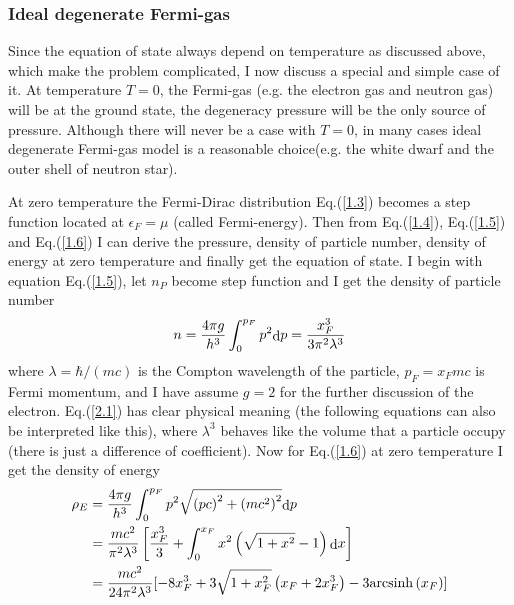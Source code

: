 \documentclass[reprint]{revtex4-1}
\begin{document}
\subsubsection{Ideal degenerate Fermi-gas}
Since the equation of state always depend on temperature as discussed above, which make the problem complicated, I now discuss a special and simple case of it. At temperature $T=0$,  the Fermi-gas (e.g. the electron gas and neutron gas) will be at the ground state, the degeneracy pressure will be the only source of pressure. Although there will never be a case with $T=0$, in many cases ideal degenerate Fermi-gas model is a reasonable choice(e.g. the white dwarf and the outer shell of neutron star). \par
At zero temperature the Fermi-Dirac distribution Eq.(\ref{1.3}) becomes a step function located at $\epsilon_F=\mu$ (called Fermi-energy). Then from Eq.(\ref{1.4}), Eq.(\ref{1.5}) and Eq.(\ref{1.6}) I can derive the pressure, density of particle number, density of energy at zero temperature and finally get the equation of state. I begin with equation Eq.(\ref{1.5}), let $n_P$  become step function and I get the density of particle number 
\begin{equation}
n = \frac{{4\pi g}}{{{h^3}}}\int_0^{{p_F}} {{p^2}{\mathop{\rm d}\nolimits} p}  = \frac{{x_F^3}}{{3{\pi ^2}{\lambda ^3}}} \label{2.1}
\end{equation}
where $\lambda  = \hbar /\left( {mc} \right)$ is the Compton wavelength of the particle, ${p_F} = {x_F}mc$ is Fermi momentum, and I have assume $g=2$ for the further discussion of the electron. Eq.(\ref{2.1}) has clear physical meaning (the following equations can also be interpreted like this), where $\lambda^3$ behaves like the volume that a particle occupy (there is just a difference of coefficient). Now for Eq.(\ref{1.6}) at zero temperature I get the density of energy
\begin{align}
	 {\rho _E} &= {{4\pi g} \over {{h^3}}}\int_0^{{p_F}} {{p^2}\sqrt {{{\left( {pc} \right)}^2} + {{\left( {m{c^2}} \right)}^2}} {\mathop{\rm d}\nolimits} p}  \nonumber \\
	 &= {{m{c^2}} \over {{\pi ^2}{\lambda ^3}}}\left[ {{{x_F^3} \over 3} + \int_0^{{x_F}} {{x^2}\left( {\sqrt {1 + {x^2}}  - 1} \right){\mathop{\rm d}\nolimits} x} } \right]  \nonumber \\ 
	& {\rm{                                 }} = {{m{c^2}} \over {24{\pi ^2}{\lambda ^3}}}[{ - 8x_F^3 + 3\sqrt {1 + x_F^2} \left( {{x_F} + 2x_F^3} \right) - 3{\mathop{\rm arcsinh}\nolimits} \left( {{x_F}} \right)}] \label{2.2}
\end{align}
\end{document}
